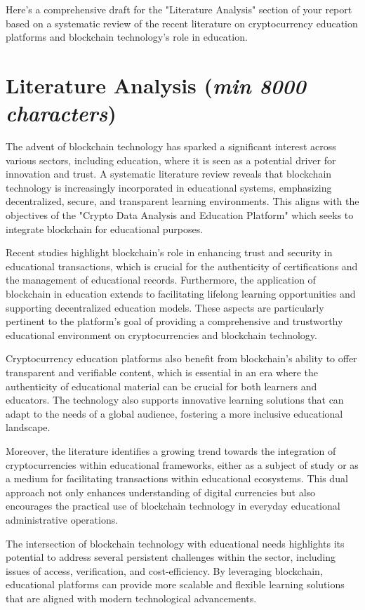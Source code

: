 \documentclass[12pt]{report}
\newcommand{\characters}[1]{(\textit{min #1 characters})}
\begin{document}
Here's a comprehensive draft for the "Literature Analysis" section of your report based on a systematic review of the recent literature on cryptocurrency education platforms and blockchain technology's role in education.

\section{Literature Analysis \characters{8000}}
The advent of blockchain technology has sparked a significant interest across various sectors, including education, where it is seen as a potential driver for innovation and trust. A systematic literature review reveals that blockchain technology is increasingly incorporated in educational systems, emphasizing decentralized, secure, and transparent learning environments. This aligns with the objectives of the "Crypto Data Analysis and Education Platform" which seeks to integrate blockchain for educational purposes.

Recent studies highlight blockchain's role in enhancing trust and security in educational transactions, which is crucial for the authenticity of certifications and the management of educational records. Furthermore, the application of blockchain in education extends to facilitating lifelong learning opportunities and supporting decentralized education models. These aspects are particularly pertinent to the platform's goal of providing a comprehensive and trustworthy educational environment on cryptocurrencies and blockchain technology.

Cryptocurrency education platforms also benefit from blockchain's ability to offer transparent and verifiable content, which is essential in an era where the authenticity of educational material can be crucial for both learners and educators. The technology also supports innovative learning solutions that can adapt to the needs of a global audience, fostering a more inclusive educational landscape.

Moreover, the literature identifies a growing trend towards the integration of cryptocurrencies within educational frameworks, either as a subject of study or as a medium for facilitating transactions within educational ecosystems. This dual approach not only enhances understanding of digital currencies but also encourages the practical use of blockchain technology in everyday educational administrative operations.

The intersection of blockchain technology with educational needs highlights its potential to address several persistent challenges within the sector, including issues of access, verification, and cost-efficiency. By leveraging blockchain, educational platforms can provide more scalable and flexible learning solutions that are aligned with modern technological advancements.
\end{document}
